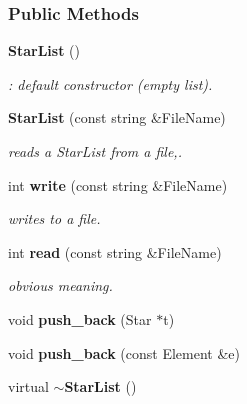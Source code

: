 \subsubsection*{Public Methods}
\begin{CompactItemize}
\item 
{}
{\bf Star\-List} ()\label{class_starlist_a0}

\begin{CompactList}\small\item\em : default constructor (empty list).\item\end{CompactList}\item 
{\bf Star\-List} (const string \&File\-Name)
\begin{CompactList}\small\item\em reads a Star\-List from a file,.\item\end{CompactList}\item 
int {\bf write} (const string \&File\-Name)
\begin{CompactList}\small\item\em writes to a file.\item\end{CompactList}\item 
{}
int {\bf read} (const string \&File\-Name)\label{class_starlist_a3}

\begin{CompactList}\small\item\em obvious meaning.\item\end{CompactList}\item 
{}
void {\bf push\_\-back} (Star $\ast$t)\label{class_starlist_a4}

\item 
{}
void {\bf push\_\-back} (const Element \&e)\label{class_starlist_a5}

\item 
{}
virtual {\bf $\sim$Star\-List} ()\label{class_starlist_a6}


\end{CompactItemize}
